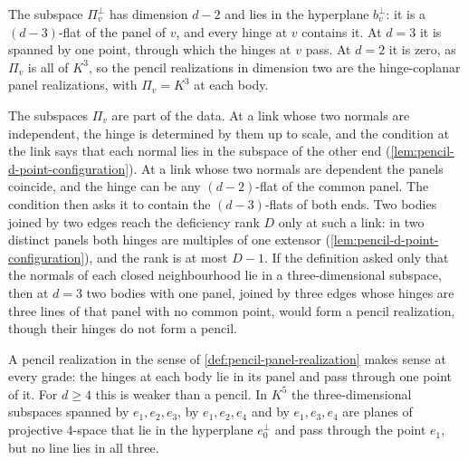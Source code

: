 The subspace $\Pi_v^{\perp}$ has dimension $d - 2$ and lies in the
hyperplane $b_v^{\perp}$: it is a $(d-3)$-flat of the panel of $v$, and
every hinge at $v$ contains it. At $d = 3$ it is spanned by one point,
through which the hinges at $v$ pass. At $d = 2$ it is zero, as $\Pi_v$
is all of $K^3$, so the pencil realizations in dimension two are the
hinge-coplanar panel realizations, with $\Pi_v = K^3$ at each body.

The subspaces $\Pi_v$ are part of the data. At a link whose two normals
are independent, the hinge is determined by them up to scale, and the
condition at the link says that each normal lies in the subspace of the
other end (\cref{lem:pencil-d-point-configuration}). At a link whose two
normals are dependent the panels coincide, and the hinge can be any
$(d-2)$-flat of the common panel. The condition then asks it to contain
the $(d-3)$-flats of both ends. Two bodies joined by two edges reach the
deficiency rank $D$ only at such a link: in two distinct panels both
hinges are multiples of one extensor
(\cref{lem:pencil-d-point-configuration}), and the rank is at most
$D - 1$. If the definition asked only that the normals of each closed
neighbourhood lie in a three-dimensional subspace, then at $d = 3$ two
bodies with one panel, joined by three edges whose hinges are three
lines of that panel with no common point, would form a pencil
realization, though their hinges do not form a pencil.

\begin{remark}
  \label{rem:pencil-d-point-type}
  A pencil realization in the sense of
  \cref{def:pencil-panel-realization} makes sense at every grade: the
  hinges at each body lie in its panel and pass through one point of
  it. For $d \ge 4$ this is weaker than a pencil. In $K^5$ the
  three-dimensional subspaces spanned by $e_1, e_2, e_3$, by
  $e_1, e_2, e_4$ and by $e_1, e_3, e_4$ are planes of projective
  $4$-space that lie in the hyperplane $e_0^{\perp}$ and pass through
  the point $e_1$, but no line lies in all three.
\end{remark}

